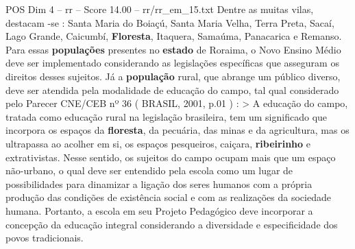 \begin{textsample}{POS Dim 4 – rr – Score 14.00 – rr/rr\_em\_15.txt}
Dentre as muitas vilas, destacam -se : Santa Maria do Boiaçú, Santa Maria Velha, Terra Preta, Sacaí, Lago Grande, Caicumbí, \textbf{Floresta}, Itaquera, Samaúma, Panacarica e Remanso.
Para essas \textbf{populações} presentes no \textbf{estado} de Roraima, o Novo Ensino Médio deve ser implementado considerando as legislações específicas que asseguram os direitos desses sujeitos.
Já a \textbf{população} rural, que abrange um público diverso, deve ser atendida pela modalidade de educação do campo, tal qual considerado pelo Parecer CNE/CEB nº 36 ( BRASIL, 2001, p.01 ) : > A educação do campo, tratada como educação rural na legislação brasileira, tem um significado que incorpora os espaços da \textbf{floresta}, da pecuária, das minas e da agricultura, mas os ultrapassa ao acolher em si, os espaços pesqueiros, caiçara, \textbf{ribeirinho} e extrativistas.
Nesse sentido, os sujeitos do campo ocupam mais que um espaço não-urbano, o qual deve ser entendido pela escola como um lugar de possibilidades para dinamizar a ligação dos seres humanos com a própria produção das condições de existência social e com as realizações da sociedade humana.
Portanto, a escola em seu Projeto Pedagógico deve incorporar a concepção da educação integral considerando a diversidade e especificidade dos povos tradicionais.

\end{textsample}
